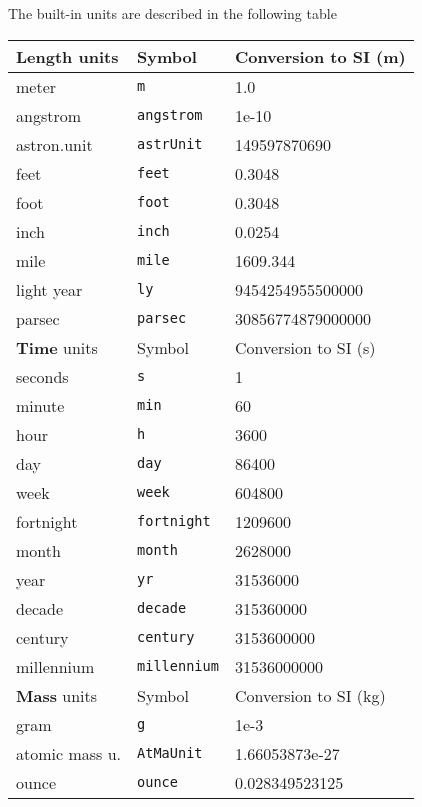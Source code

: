 \documentclass[a4paper,10pt]{article}
\begin{document}
The built-in units are described in the following table
\small
\begin{center}
\begin{tabular}{lll}
\hline
{\bf Length} units & Symbol & Conversion to SI (m)\\
\hline
     meter         &\texttt{m} &         1.0\\
     angstrom      &\texttt{angstrom} &  1e-10\\
     astron.unit   &\texttt{astrUnit} & 149597870690\\
     feet          &\texttt{feet} &      0.3048\\
     foot          &\texttt{foot} &      0.3048\\
     inch          &\texttt{inch} &      0.0254\\
     mile          &\texttt{mile} &      1609.344\\
     light year    &\texttt{ly} &        9454254955500000\\
     parsec        &\texttt{parsec} &    30856774879000000\\
\hline
{\bf Time} units & Symbol & Conversion to SI (s)\\
\hline
     seconds        &\texttt{s} &                     1\\
     minute         &\texttt{min} &                  60\\
     hour           &\texttt{h} &                  3600\\
     day            &\texttt{day} &               86400\\
     week           &\texttt{week} &             604800\\
     fortnight      &\texttt{fortnight} &       1209600\\
     month          &\texttt{month} &           2628000\\
     year           &\texttt{yr} &             31536000\\
     decade         &\texttt{decade} &        315360000\\
     century        &\texttt{century} &      3153600000\\
     millennium     &\texttt{millennium} &  31536000000\\
\hline
{\bf Mass} units & Symbol & Conversion to SI (kg)\\
\hline
     gram           &\texttt{g} &          1e-3\\
     atomic mass u. &\texttt{AtMaUnit} &   1.66053873e-27\\
     ounce          &\texttt{ounce} &      0.028349523125\\

\end{tabular}
\end{center}
\end{document}
